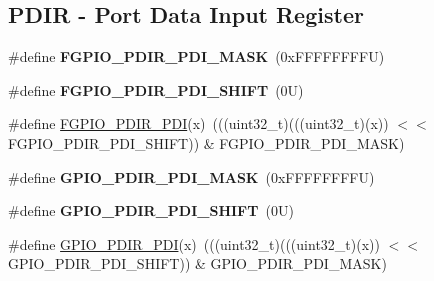 \subsection*{P\+D\+IR -\/ Port Data Input Register}
\begin{DoxyCompactItemize}
\item 
\mbox{\label{group___f_g_p_i_o___register___masks_ga49077fe6b4cbd499bfa84f4b4c1be74c}} 
\#define {\bfseries F\+G\+P\+I\+O\+\_\+\+P\+D\+I\+R\+\_\+\+P\+D\+I\+\_\+\+M\+A\+SK}~(0x\+F\+F\+F\+F\+F\+F\+F\+F\+U)
\item 
\mbox{\label{group___f_g_p_i_o___register___masks_gaadc2ff381ef7eb1254eaab329f935aae}} 
\#define {\bfseries F\+G\+P\+I\+O\+\_\+\+P\+D\+I\+R\+\_\+\+P\+D\+I\+\_\+\+S\+H\+I\+FT}~(0\+U)
\item 
\#define \mbox{\hyperlink{group___f_g_p_i_o___register___masks_gaa197ae1640b4c22ba461518f607c5608}{F\+G\+P\+I\+O\+\_\+\+P\+D\+I\+R\+\_\+\+P\+DI}}(x)~(((uint32\+\_\+t)(((uint32\+\_\+t)(x)) $<$$<$ F\+G\+P\+I\+O\+\_\+\+P\+D\+I\+R\+\_\+\+P\+D\+I\+\_\+\+S\+H\+I\+FT)) \& F\+G\+P\+I\+O\+\_\+\+P\+D\+I\+R\+\_\+\+P\+D\+I\+\_\+\+M\+A\+SK)
\item 
\mbox{\label{group___f_g_p_i_o___register___masks_gacb7c8cc976937906c8e803811a7fbb68}} 
\#define {\bfseries G\+P\+I\+O\+\_\+\+P\+D\+I\+R\+\_\+\+P\+D\+I\+\_\+\+M\+A\+SK}~(0x\+F\+F\+F\+F\+F\+F\+F\+F\+U)
\item 
\mbox{\label{group___f_g_p_i_o___register___masks_ga99fd9212dd769bb1964a28a864c6c741}} 
\#define {\bfseries G\+P\+I\+O\+\_\+\+P\+D\+I\+R\+\_\+\+P\+D\+I\+\_\+\+S\+H\+I\+FT}~(0\+U)
\item 
\#define \mbox{\hyperlink{group___f_g_p_i_o___register___masks_ga8f80c8e42743151c73569b5cef49f2b2}{G\+P\+I\+O\+\_\+\+P\+D\+I\+R\+\_\+\+P\+DI}}(x)~(((uint32\+\_\+t)(((uint32\+\_\+t)(x)) $<$$<$ G\+P\+I\+O\+\_\+\+P\+D\+I\+R\+\_\+\+P\+D\+I\+\_\+\+S\+H\+I\+FT)) \& G\+P\+I\+O\+\_\+\+P\+D\+I\+R\+\_\+\+P\+D\+I\+\_\+\+M\+A\+SK)
\end{DoxyCompactItemize}
